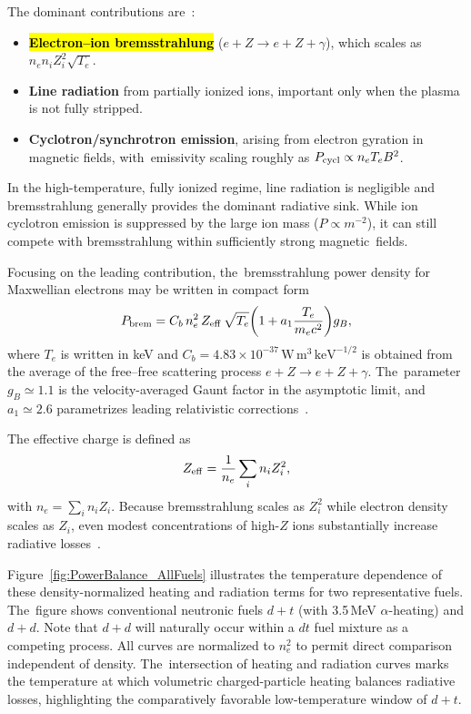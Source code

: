 \documentclass[particles,article,accept,pdftex,moreauthors]{Definitions/mdpi}
\begin{document}
The dominant contributions are~\cite{Blumenthal:1970gc}:
\begin{itemize}
\item[(a)] \textbf{\hl{Electron--ion bremsstrahlung} %
} ($e+Z\rightarrow e+Z+\gamma$), which scales as $n_e n_i Z_i^2 \sqrt{T_e}$.
\item[(b)] \textbf{Line radiation} from partially ionized ions, important only when the plasma is not fully stripped.
\item[(c)] \textbf{Cyclotron/synchrotron emission}, arising from electron gyration in magnetic fields, with~emissivity scaling roughly as $P_{\rm cycl}\propto n_e T_e B^2$.
\end{itemize}

In the high-temperature, fully ionized regime, line radiation is negligible and bremsstrahlung generally provides the dominant radiative sink. While ion cyclotron emission is suppressed by the large ion mass ($P\propto m^{-2}$), it can still compete with bremsstrahlung within sufficiently strong magnetic~fields.

Focusing on the leading contribution, the~bremsstrahlung power density for Maxwellian electrons may be written in compact form~\cite{Beresnyak:2023nrl}
\begin{align}
P_{\rm brem}
= C_b\, n_e^2\, Z_{\rm eff}\,
\sqrt{T_e}
\left(1 + a_1\frac{T_e}{m_e c^2}\right)
g_B ,
\label{eq:powerBrem}
\end{align}
where $T_{e}$ is written in keV and $C_b=4.83\times10^{-37}\,\mathrm{W\,m^3\,keV^{-1/2}}$ is obtained from the average of the free--free scattering process $e+Z\to e+Z+\gamma$. The~parameter $g_B\simeq1.1$ is the velocity-averaged Gaunt factor in the asymptotic limit, and~$a_1\simeq2.6$ parametrizes leading relativistic corrections~\cite{morse2018nuclear}.

The effective charge is defined as
\begin{align}
Z_{\rm eff}
= \frac{1}{n_e}
\sum_i n_i Z_i^2 ,
\end{align}
with $n_e=\sum_i n_i Z_i$. 
Because bremsstrahlung scales as $Z_i^2$ while electron density scales as $Z_i$, even modest concentrations of high-$Z$ ions substantially increase radiative losses~\cite{ochs2026bremsstrahlung}.



Figure~\ref{fig:PowerBalance_AllFuels} illustrates the temperature dependence of these density-normalized heating and radiation terms for two representative fuels. The~figure shows conventional neutronic fuels $d+t$ (with 3.5\,MeV $\alpha$-heating) and $d+d$. Note that $d+d$ will naturally occur within a $dt$ fuel mixture as a competing process. All curves are normalized to $n_e^2$ to permit direct comparison independent of density. The~intersection of heating and radiation curves marks the temperature at which volumetric charged-particle heating balances radiative losses, highlighting the comparatively favorable low-temperature window of $d+t$.
\end{document}
